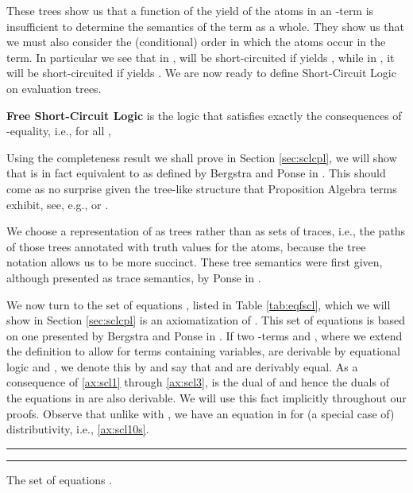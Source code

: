 These trees show us that a function of the yield of the atoms in an -term
is insufficient to determine the semantics of the term as a whole. They show us
that we must also consider the (conditional) order in which the atoms occur in
the term. In particular we see that in ,  will be
short-circuited if  yields , while in , it will be
short-circuited if  yields . We are now ready to define
Short-Circuit Logic on evaluation trees.
\begin{definition}
\textbf{Free Short-Circuit Logic } is the logic that satisfies
exactly the consequences of -equality, i.e., for all ,

\end{definition}
Using the completeness result we shall prove in Section \ref{sec:sclcpl}, we
will show that  is in fact equivalent to  as defined by Bergstra
and Ponse in \cite{scl}. This should come as no surprise given the tree-like
structure that Proposition Algebra terms exhibit, see, e.g., \cite{pa} or
\cite{pascl}.

We choose a representation of  as trees rather than as sets of traces,
i.e., the paths of those trees annotated with truth values for the atoms,
because the tree notation allows us to be more succinct. These tree semantics
were first given, although presented as trace semantics, by Ponse in
\cite{tt}.

We now turn to the set of equations , listed in Table
\ref{tab:eqfscl}, which we will show in Section \ref{sec:sclcpl} is an
axiomatization of . This set of equations is based on one presented by
Bergstra and Ponse in \cite{scl}. If two -terms  and , where we
extend the definition to allow for terms containing variables, are derivable by
equational logic and , we denote this by  and
say that  and  are derivably equal. As a consequence of \eqref{ax:scl1}
through \eqref{ax:scl3},  is the dual of  and hence the
duals of the equations in  are also derivable. We will use this fact
implicitly throughout our proofs. Observe that unlike with , we have
an equation in  for (a special case of) distributivity, i.e.,
\eqref{ax:scl10s}.

\begin{table}[htbp]
\hrule

\hrule
\vspace{1em}
\caption{The set of equations \textbf{\EqFSCL}.}
\label{tab:eqfscl}
\end{table}



